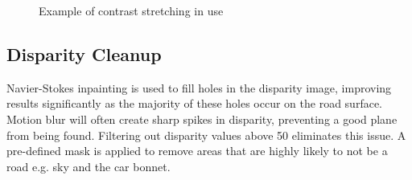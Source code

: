 \documentclass[10pt]{article}
\begin{document}
    \begin{figure}[!h]
        \centering
        \hfill
        \hfill
        \hfill

        \caption{Example of contrast stretching in use}
    \end{figure}

\newpage

\subsection *{Disparity Cleanup}
    Navier-Stokes inpainting is used to fill holes in the disparity image, improving results significantly as the majority of these holes occur on the road surface. Motion blur will often create sharp spikes in disparity, preventing a good plane from being found. Filtering out disparity values above 50 eliminates this issue. A pre-defined mask is applied to remove areas that are highly likely to not be a road e.g. sky and the car bonnet.
\end{document}

